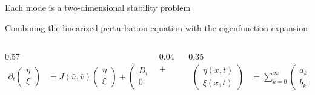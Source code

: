 \begin{frame}{Each mode is a two-dimensional stability problem}

  \vspace{-0.26cm}

  {\color{HydraMuted}\fontsize{7.4}{9}\selectfont
    Combining the linearized perturbation equation with the eigenfunction expansion
  \par}

  \vspace{-0.12cm}

  \begin{columns}[c,onlytextwidth]

    \begin{column}{0.57\textwidth}
      {\color{HydraWhite}\fontsize{7.5}{9.3}\selectfont
      \begin{align*}
        \partial_t
        \begin{pmatrix}
          \eta\\
          \xi
        \end{pmatrix}
        &=
        J(\bar u,\bar v)
        \begin{pmatrix}
          \eta\\
          \xi
        \end{pmatrix}
        +
        \begin{pmatrix}
          D_u&0\\
          0&D_v
        \end{pmatrix}
        \Delta
        \begin{pmatrix}
          \eta\\
          \xi
        \end{pmatrix}
      \end{align*}
      }
    \end{column}

    \begin{column}{0.04\textwidth}
      \centering
      {\color{HydraGold}\bfseries\fontsize{15}{15}\selectfont
        $+$
      }
    \end{column}

    \begin{column}{0.35\textwidth}
      {\color{HydraWhite}\fontsize{7.9}{9.8}\selectfont
      \begin{align*}
        \begin{pmatrix}
          \eta(x,t)\\
          \xi(x,t)
        \end{pmatrix}
        &=
        \sum_{k=0}^{\infty}
        \begin{pmatrix}
          a_k(t)\\
          b_k(t)
        \end{pmatrix}
        \phi_k(x)
      \end{align*}
      }
    \end{column}


\end{columns}
\end{frame}
